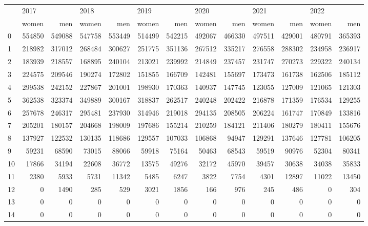 \begin{tabular}{lrrrrrrrrrrrr}
\toprule
{} & \multicolumn{2}{l}{2017} & \multicolumn{2}{l}{2018} & \multicolumn{2}{l}{2019} & \multicolumn{2}{l}{2020} & \multicolumn{2}{l}{2021} & \multicolumn{2}{l}{2022} \\
{} &   women &     men &   women &     men &   women &     men &   women &     men &   women &     men &   women &     men \\
\midrule
0  &  554850 &  549088 &  547758 &  553449 &  514499 &  542215 &  492067 &  466330 &  497511 &  429001 &  480791 &  365393 \\
1  &  218982 &  317012 &  268484 &  300627 &  251775 &  351136 &  267512 &  335217 &  276558 &  288302 &  234958 &  236917 \\
2  &  183939 &  218557 &  168895 &  240104 &  213021 &  239992 &  214849 &  237457 &  231747 &  270273 &  229322 &  240134 \\
3  &  224575 &  209546 &  190274 &  172802 &  151855 &  166709 &  142481 &  155697 &  173473 &  161738 &  162506 &  185112 \\
4  &  299538 &  242152 &  227867 &  201001 &  198930 &  170363 &  140937 &  147745 &  123055 &  127009 &  121065 &  121303 \\
5  &  362538 &  323374 &  349889 &  300167 &  318837 &  262517 &  240248 &  202422 &  216878 &  171359 &  176534 &  129255 \\
6  &  257678 &  246317 &  295481 &  237930 &  314946 &  219018 &  294135 &  208505 &  206224 &  161747 &  170849 &  133816 \\
7  &  205201 &  180157 &  204668 &  198009 &  197686 &  155214 &  210259 &  184121 &  211406 &  180279 &  180411 &  155676 \\
8  &  137927 &  122532 &  130135 &  118686 &  129557 &  107033 &  106868 &   94947 &  129291 &  137646 &  127781 &  106205 \\
9  &   59231 &   68590 &   73015 &   88066 &   59918 &   75164 &   50463 &   68543 &   59519 &   90976 &   52304 &   80341 \\
10 &   17866 &   34194 &   22608 &   36772 &   13575 &   49276 &   32172 &   45970 &   39457 &   30638 &   34038 &   35833 \\
11 &    2380 &    5933 &    5731 &   11342 &    5485 &    6247 &    3822 &    7754 &    4301 &   12897 &   11022 &   13450 \\
12 &       0 &    1490 &     285 &     529 &    3021 &    1856 &     166 &     976 &     245 &     486 &       0 &     304 \\
13 &       0 &       0 &       0 &       0 &       0 &       0 &       0 &       0 &       0 &       0 &       0 &       0 \\
14 &       0 &       0 &       0 &       0 &       0 &       0 &       0 &       0 &       0 &       0 &       0 &       0 \\
\bottomrule
\end{tabular}

